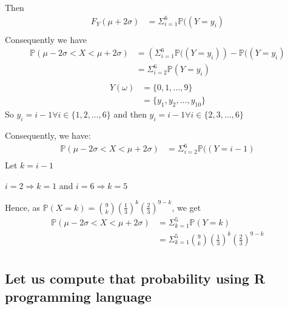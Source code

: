 \documentclass[11pt]{article}
\def\lt{<}
\begin{document}
Then 
\begin{align*}
F_Y(\mu +2\sigma) &= \Sigma_{i=1}^{6}{ \mathbb {P}((Y=y_i)}   \\          
\end{align*}
Consequently we have 
\begin{align*}
\mathbb {P}(\mu -2\sigma \lt  X \lt \mu+2\sigma) &=(\Sigma_{i=1}^{6}{ \mathbb {P}((Y=y_i)}) -\mathbb {P}((Y=y_i)  \\
&=\Sigma_{i=2}^{6}{ \mathbb {P}(Y=y_i)}  \\
\end{align*}
\begin{align*}
Y(\omega)&=\{0, 1, \ldots, 9\}\\ 
         &=\{y_1, y_2, \ldots, y_{10}\} 
\end{align*}
So $y_i=i-1 \forall i \in \{1, 2, \ldots, 6\} $ and then $y_i=i-1 \forall i \in \{2, 3, \ldots, 6\} $

Consequently, we have:
\begin{align*}
\mathbb {P}(\mu -2\sigma \lt  X \lt \mu+2\sigma)
&=\Sigma_{i=2}^{6}{\mathbb {P}((Y=i-1)}  \\
\end{align*}
Let $k=i-1$

$i=2 \Rightarrow k=1$ and $i=6 \Rightarrow k=5$

Hence, as $\mathbb {P}(X=k)=\binom{9}{k}(\frac{1}{3})^k(\frac{2}{3})^{9-k}$, we get  
\begin{align*}
\mathbb {P}(\mu -2\sigma \lt  X \lt \mu+2\sigma)
&=\Sigma_{k=1}^{5}{\mathbb {P}(Y=k)}  \\
&=\Sigma_{k=1}^{5}{ \binom{9}{k}(\frac{1}{3})^k(\frac{2}{3})^{9-k}}  \\
\end{align*}

\subsection{Let us compute that probability using R programming language}
\end{document}
